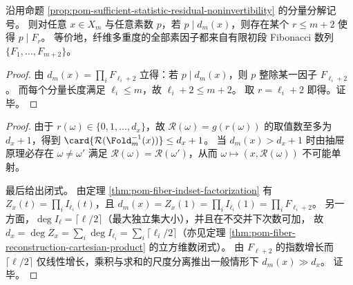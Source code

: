 \begin{corollary}\label{cor:pom-fiber-multiplicity-fibonacci-prime-closure}
沿用命题 \ref{prop:pom-sufficient-statistic-residual-noninvertibility} 的分量分解记号。
则对任意 \(x\in X_m\) 与任意素数 \(p\)，若 \(p\mid d_m(x)\)，则存在某个 \(r\le m+2\) 使得 \(p\mid F_r\)。
等价地，纤维多重度的全部素因子都来自有限初段 Fibonacci 数列 \(\{F_1,\dots,F_{m+2}\}\)。
\end{corollary}
\begin{proof}
由 \(d_m(x)=\prod_i F_{\ell_i+2}\) 立得：若 \(p\mid d_m(x)\)，则 \(p\) 整除某一因子 \(F_{\ell_i+2}\)。
而每个分量长度满足 \(\ell_i\le m\)，故 \(\ell_i+2\le m+2\)。
取 \(r=\ell_i+2\) 即得。证毕。
\end{proof}

\begin{proof}
由于 \(r(\omega)\in\{0,1,\dots,d_x\}\)，故 \(\mathcal R(\omega)=g(r(\omega))\) 的取值数至多为 \(d_x+1\)，得到 \(\card{\mathcal R(\Fold_m^{-1}(x))}\le d_x+1\)。
当 \(d_m(x)>d_x+1\) 时由抽屉原理必存在 \(\omega\neq\omega'\) 满足 \(\mathcal R(\omega)=\mathcal R(\omega')\)，从而 \(\omega\mapsto(x,\mathcal R(\omega))\) 不可能单射。
\par
最后给出闭式。
由定理 \ref{thm:pom-fiber-indset-factorization} 有 \(Z_x(t)=\prod_i I_{\ell_i}(t)\)，且 \(d_m(x)=Z_x(1)=\prod_i I_{\ell_i}(1)=\prod_i F_{\ell_i+2}\)。
另一方面，\(\deg I_{\ell}=\lceil \ell/2\rceil\)（最大独立集大小），并且在不交并下次数可加，
故 \(d_x=\deg Z_x=\sum_i \deg I_{\ell_i}=\sum_i \lceil \ell_i/2\rceil\)（亦见定理 \ref{thm:pom-fiber-reconstruction-cartesian-product} 的立方维数闭式）。
由 \(F_{\ell+2}\) 的指数增长而 \(\lceil \ell/2\rceil\) 仅线性增长，乘积与求和的尺度分离推出一般情形下 \(d_m(x)\gg d_x\)。
证毕。
\end{proof}

